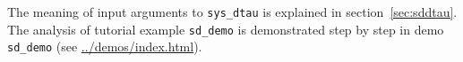 \documentclass[10pt]{scrartcl}
\newcommand{\DDEBIFCODE}{\textsc{DDE-BIFTOOL}}
\newcommand{\demobase}{\url{../demos/index.html}}
\newcommand{\blist}[1]{\mbox{\lstinline!#1!}}
\begin{document}
{

The meaning of input arguments to \blist{sys_dtau} is explained in
section~\ref{sec:sddtau}. The analysis of tutorial example
\blist{sd_demo} is demonstrated step by step in demo \texttt{sd\_demo}
(see \demobase{}).
 \newpage

}
\end{document}
